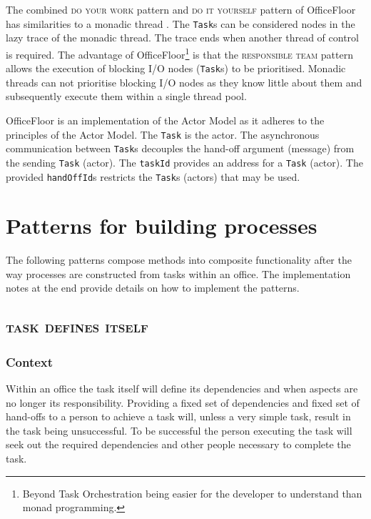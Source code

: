 \documentclass[prodmode]{style/acmlarge}
\begin{document}
The combined \textsc{do your work} pattern and \textsc{do it yourself} pattern
of OfficeFloor has similarities to a monadic thread \cite{monadic-thread}.  The
\texttt{Task}s can be considered nodes in the lazy trace of the monadic thread. 
The trace ends when another thread of control is required.  The advantage of
OfficeFloor\footnote{Beyond Task Orchestration being easier for the developer to
understand than monad programming.} is that the \textsc{responsible team}
pattern allows the execution of blocking I/O nodes (\texttt{Task}s) to be
prioritised.  Monadic threads can not prioritise blocking I/O nodes as they know
little about them and subsequently execute them within a single thread pool.

OfficeFloor is an implementation of the Actor Model \cite{actors} as it adheres
to the principles of the Actor Model.  The \texttt{Task} is the actor.  The
asynchronous communication between \texttt{Task}s decouples the hand-off
argument (message) from the sending \texttt{Task} (actor).  The \texttt{taskId}
provides an address for a \texttt{Task} (actor).  The provided
\texttt{handOffId}s restricts the \texttt{Task}s (actors) that may be used.




\section{Patterns for building processes}

The following patterns compose methods into composite functionality after the
way processes are constructed from tasks within an office.  The implementation
notes at the end provide details on how to implement the patterns.


\subsection{\textsc{\textbf{task defines itself}}}

\subsubsection*{Context} Within an office the task itself will define its
dependencies and when aspects are no longer its responsibility.  Providing a
fixed set of dependencies and fixed set of hand-offs to a person to achieve a
task will, unless a very simple task, result in the task being unsuccessful.  To
be successful the person executing the task will seek out the required
dependencies and other people necessary to complete the task.
\end{document}
